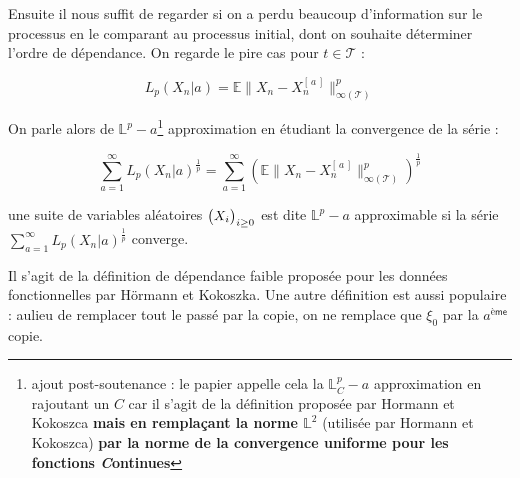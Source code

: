 \bigskip

Ensuite il nous suffit de regarder si on a perdu beaucoup d'information sur le processus en le comparant au processus initial, dont on souhaite déterminer l'ordre de dépendance. On regarde le pire cas pour $t \in \mathcal T$ :

$$L_p(X_n | a ) = {\mathds E  \lVert {X_n} - {X_n^{[\, a \, ]}} } \rVert_{\infty(\mathcal T)} ^p$$

On parle alors de $\mathds L^p-a$\footnote{ajout post-soutenance : le papier appelle cela la \og $\mathds L^p_C-a$ \fg approximation en rajoutant un $C$ car il s'agit de la définition proposée par Hormann et Kokoszca \textbf{mais en remplaçant la norme $\mathds L^2$} (utilisée par Hormann et Kokoszca) \textbf{par la norme de la convergence uniforme pour les fonctions \emph{C}ontinues} } approximation en étudiant la convergence de la série :

$$\sum\limits_{a=1}^\infty L_p(X_n | a )^{\frac 1 p} = \sum\limits_{a=1}^\infty \left({\mathds E  \lVert {X_n} - {X_n^{[\, a \, ]}} } \rVert_{\infty(\mathcal T)} ^p\right)^{\frac 1 p}$$

\begin{definition}
	une suite de variables aléatoires ${\bigl( {X}_{i} \bigr)}_{{i } \geq 0}$ est dite $\mathds L^p - a$ approximable si la série $\sum\limits_{a=1}^\infty L_p(X_n | a )^{\frac 1 p}$ converge.
\end{definition}


Il s'agit de la définition de dépendance faible proposée pour les données fonctionnelles par Hörmann et Kokoszka\cite{weakly-dependent-functional-data}. Une autre définition est aussi populaire : aulieu de remplacer tout le passé par la copie, on ne remplace que $\xi_0$ par la $a^{\textsf{ème}}$ copie.

